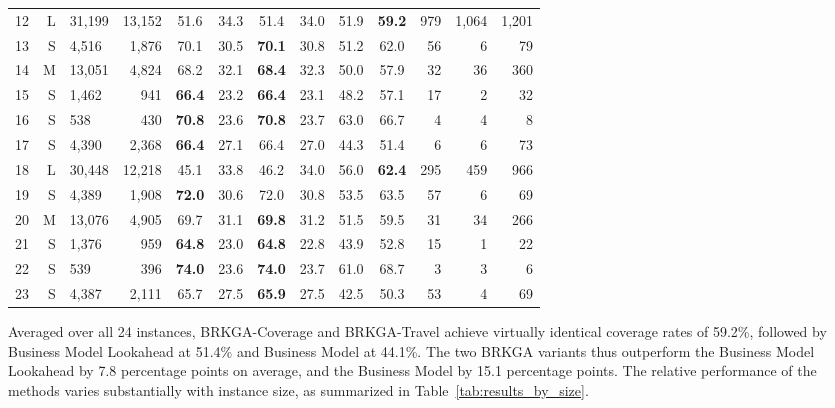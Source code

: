 \documentclass[runningheads]{llncs}
\begin{document}
\begin{table}[ht]
\begin{tabular}{rrlr|cc|cc|c|c|rrr}
    12 & L & 31{,}199 & 13{,}152 & 51.6 & 34.3 & 51.4 & 34.0 & 51.9 & \textbf{59.2} &     979 &    1{,}064 & 1{,}201 \\
13 & S &  4{,}516 &  1{,}876 & 70.1 & 30.5 & \textbf{70.1} & 30.8 & 51.2 & 62.0 &      56 &      6 &    79 \\
14 & M & 13{,}051 &  4{,}824 & 68.2 & 32.1 & \textbf{68.4} & 32.3 & 50.0 & 57.9 &      32 &     36 &   360 \\
15 & S &  1{,}462 &    941   & \textbf{66.4} & 23.2 & \textbf{66.4} & 23.1 & 48.2 & 57.1 &      17 &      2 &    32 \\
16 & S &    538   &    430   & \textbf{70.8} & 23.6 & \textbf{70.8} & 23.7 & 63.0 & 66.7 &       4 &      4 &     8 \\
17 & S &  4{,}390 &  2{,}368 & \textbf{66.4} & 27.1 & 66.4 & 27.0 & 44.3 & 51.4 &       6 &      6 &    73 \\
18 & L & 30{,}448 & 12{,}218 & 45.1 & 33.8 & 46.2 & 34.0 & 56.0 & \textbf{62.4} &     295 &    459 &   966 \\
19 & S &  4{,}389 &  1{,}908 & \textbf{72.0} & 30.6 & 72.0 & 30.8 & 53.5 & 63.5 &      57 &      6 &    69 \\
20 & M & 13{,}076 &  4{,}905 & 69.7 & 31.1 & \textbf{69.8} & 31.2 & 51.5 & 59.5 &      31 &     34 &   266 \\
21 & S &  1{,}376 &    959   & \textbf{64.8} & 23.0 & \textbf{64.8} & 22.8 & 43.9 & 52.8 &      15 &      1 &    22 \\
22 & S &    539   &    396   & \textbf{74.0} & 23.6 & \textbf{74.0} & 23.7 & 61.0 & 68.7 &       3 &      3 &     6 \\
23 & S &  4{,}387 &  2{,}111 & 65.7 & 27.5 & \textbf{65.9} & 27.5 & 42.5 & 50.3 &      53 &      4 &    69 \\

\hline
\end{tabular}
\end{table}



Averaged over all 24 instances, BRKGA-Coverage and BRKGA-Travel achieve virtually identical coverage rates of 59.2\%, followed by Business Model Lookahead at 51.4\% and Business Model at 44.1\%. The two BRKGA variants thus outperform the Business Model Lookahead by 7.8 percentage points on average, and the Business Model by 15.1 percentage points. The relative performance of the methods varies substantially with instance size, as summarized in Table~\ref{tab:results_by_size}.
\end{document}
